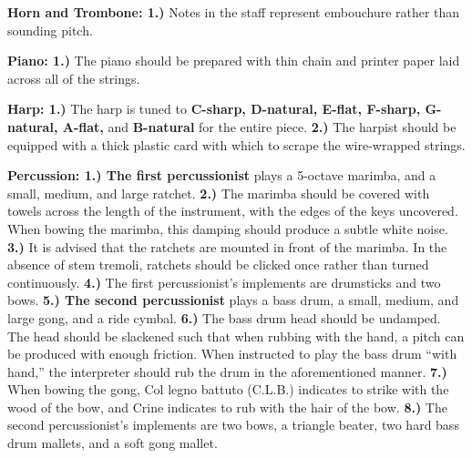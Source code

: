 \documentclass[11pt]{article}
\begin{document}
\begingroup
\begin{center}
\textbf{Horn and Trombone: 1.)} Notes in the staff represent embouchure rather than sounding pitch. \\
\rightskip\leftskip
\end{center}
\endgroup

\begingroup
\begin{center}
\textbf{Piano: 1.)} The piano should be prepared with thin chain and printer paper laid across all of the strings. \\
\rightskip\leftskip
\end{center}
\endgroup

\begingroup
\begin{center}
\textbf{Harp: 1.)} The harp is tuned to \textbf{C-sharp, D-natural, E-flat, F-sharp, G-natural, A-flat,} and \textbf{B-natural} for the entire piece. \textbf{2.)} The harpist should be equipped with a thick plastic card with which to scrape the wire-wrapped strings. \\
\rightskip\leftskip
\end{center}
\endgroup

\begingroup
\begin{center}
\textbf{Percussion: 1.) The first percussionist} plays a 5-octave marimba, and a small, medium, and large ratchet. \textbf{2.)} The marimba should be covered with towels across the length of the instrument, with the edges of the keys uncovered. When bowing the marimba, this damping should produce a subtle white noise. \textbf{3.)}  It is advised that the ratchets are mounted in front of the marimba. In the absence of stem tremoli, ratchets should be clicked once rather than turned continuously. \textbf{4.)} The first percussionist's implements are drumsticks and two bows. \textbf{5.) The second percussionist} plays a bass drum, a small, medium, and large gong, and a ride cymbal. \textbf{6.)} The bass drum head should be undamped. The head should be slackened such that when rubbing with the hand, a pitch can be produced with enough friction. When instructed to play the bass drum ``with hand,'' the interpreter should rub the drum in the aforementioned manner. \textbf{7.)} When bowing the gong, Col legno battuto (C.L.B.) indicates to strike with the wood of the bow, and Crine indicates to rub with the hair of the bow. \textbf{8.)} The second percussionist's implements are two bows, a triangle beater, two hard bass drum mallets, and a soft gong mallet. \\
\rightskip\leftskip
\end{center}
\endgroup
\end{document}
